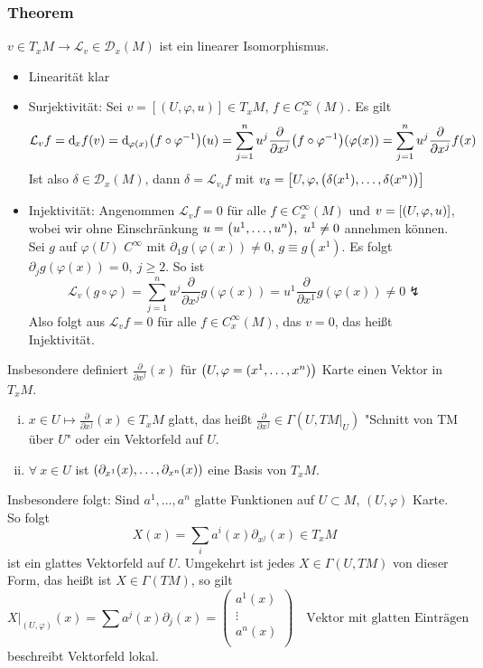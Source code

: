 \subsubsection{Theorem}
\label{ssub:150}
$v\in T_x M \to \mathcal{L}_v \in \mathcal{D}_x(M)$ ist ein linearer Isomorphismus.
\begin{itemize}
\item Linearität klar
\item Surjektivität: Sei $v = [(U,\varphi,u)] \in T_x M$, $f\in C^\infty_x (M)$. Es gilt
\[
\mathcal{L}_v f = \mathd_x f(v) = \mathd_{\varphi(x)}\enbrace*{f\circ \varphi^{-1}}(u) = \sum_{j=1}^n u^j \frac{\partial}{\partial x^j}\enbrace*{f\circ \varphi^{-1}}\enbrace*{\varphi(x)} = \sum_{j=1}^n u^j \frac{\partial}{\partial x^j} f(x) 
\]
Ist also $\delta \in \mathcal{D}_x (M)$, dann $\delta = \mathcal{L}_{v_\delta} f$ mit $v_\delta = \benbrace*{U,\varphi,\enbrace*{\delta(x^1),\ldots,\delta(x^n)}}$
\item Injektivität: Angenommen $\mathcal{L}_v f = 0$ für alle $f\in C_x^\infty (M)$ und $v = \benbrace*{\enbrace*{U,\varphi,u}}$, wobei wir ohne Einschränkung $u = \enbrace*{u^1,\ldots, u^n},\ u^1\neq 0$ annehmen können. 
Sei $g$ auf $\varphi(U)$ $C^\infty$ mit $\partial_1 g(\varphi(x)) \neq 0$, $g \equiv g(x^1)$. Es folgt $\partial_j g(\varphi(x)) = 0,\ j \geq 2$. So ist 
\[
\mathcal{L}_v (g\circ \varphi) = \sum_{j=1}^n u^j \frac{\partial}{\partial x^j} g(\varphi(x)) = u^1 \frac{\partial}{\partial x^1} g(\varphi(x)) \neq 0 \lightning
\]
Also folgt aus $\mathcal{L}_v f = 0$ für alle $f\in C^\infty_x (M)$, das $v = 0$, das heißt Injektivität.
\end{itemize}
Insbesondere definiert $\frac{\partial}{\partial x^j} (x)$ für $\enbrace*{U,\varphi = (x^1,\ldots, x^n)}$ Karte einen Vektor in $T_x M$.
\begin{enumerate}[(i)]
\item $x\in U \mapsto \frac{\partial}{\partial x^j}(x)\in T_x M$ glatt, das heißt $\frac{\partial}{\partial x^j} \in \Gamma(U,TM\vert_U)$ "Schnitt von TM über $U$" oder ein Vektorfeld auf $U$.
\item $\forall\ x \in U$ ist $\enbrace*{\partial_{x^1}(x), \ldots, \partial_{x^n}(x)}$ eine Basis von $T_x M$.
\missingfigure{}
\end{enumerate}
Insbesondere folgt: Sind $a^1,\ldots,a^n$ glatte Funktionen auf $U\subset M$, $(U,\varphi)$ Karte. So folgt
\[
X(x) = \sum_i a^i(x) \partial_{x^j}(x) \in T_x M
\]
ist ein glattes Vektorfeld auf $U$. Umgekehrt ist jedes $X\in \Gamma(U,TM)$ von dieser Form, das heißt ist $X\in \Gamma(TM)$, so gilt
\[
X\vert_{(U,\varphi)} (x) = \sum a^j(x) \partial_j(x) = 
\begin{pmatrix}
a^1(x)\\
\vdots \\
a^n(x)\\
\end{pmatrix}\quad \text{Vektor mit glatten Einträgen}
\]
beschreibt Vektorfeld lokal.

